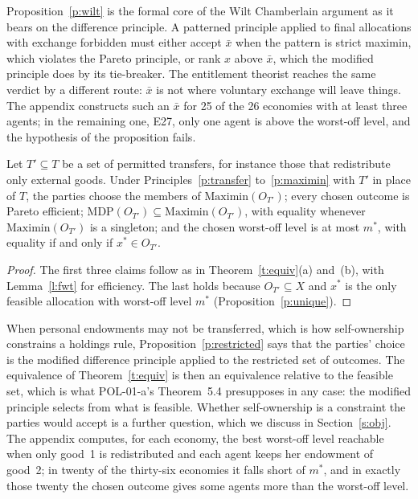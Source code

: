 \documentclass{situationist-preprint}
\begin{document}
Proposition~\ref{p:wilt} is the formal core of the Wilt Chamberlain argument as it bears on the difference principle. A patterned principle applied to final allocations with exchange forbidden must either accept $\bar{x}$ when the pattern is strict maximin, which violates the Pareto principle, or rank $x$ above $\bar{x}$, which the modified principle does by its tie-breaker. The entitlement theorist reaches the same verdict by a different route: $\bar{x}$ is not where voluntary exchange will leave things. The appendix constructs such an $\bar{x}$ for 25 of the 26 economies with at least three agents; in the remaining one, E27, only one agent is above the worst-off level, and the hypothesis of the proposition fails.

\begin{proposition}\label{p:restricted}
Let $T' \subseteq T$ be a set of permitted transfers, for instance those that redistribute only external goods. Under Principles~\ref{p:transfer} to~\ref{p:maximin} with $T'$ in place of $T$, the parties choose the members of $\mathrm{Maximin}(O_{T'})$; every chosen outcome is Pareto efficient; $\mathrm{MDP}(O_{T'}) \subseteq \mathrm{Maximin}(O_{T'})$, with equality whenever $\mathrm{Maximin}(O_{T'})$ is a singleton; and the chosen worst-off level is at most $m^*$, with equality if and only if $x^* \in O_{T'}$.
\end{proposition}

\begin{proof}
The first three claims follow as in Theorem~\ref{t:equiv}(a) and~(b), with Lemma~\ref{l:fwt} for efficiency. The last holds because $O_{T'} \subseteq X$ and $x^*$ is the only feasible allocation with worst-off level $m^*$ (Proposition~\ref{p:unique}).
\end{proof}

When personal endowments may not be transferred, which is how self-ownership constrains a holdings rule, Proposition~\ref{p:restricted} says that the parties' choice is the modified difference principle applied to the restricted set of outcomes. The equivalence of Theorem~\ref{t:equiv} is then an equivalence relative to the feasible set, which is what POL-01-a's Theorem~5.4 presupposes in any case: the modified principle selects from what is feasible. Whether self-ownership is a constraint the parties would accept is a further question, which we discuss in Section~\ref{s:obj}. The appendix computes, for each economy, the best worst-off level reachable when only good~1 is redistributed and each agent keeps her endowment of good~2; in twenty of the thirty-six economies it falls short of $m^*$, and in exactly those twenty the chosen outcome gives some agents more than the worst-off level.
\end{document}
